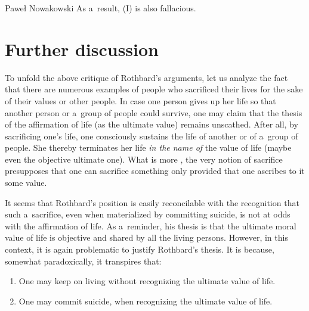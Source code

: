 \begin{artengenv}{Paweł Nowakowski}
As a~result, (I) is also fallacious.



\section{Further discussion}

To unfold the above critique of Rothbard's arguments, let us analyze the fact that there are numerous examples of people who sacrificed their lives for the sake of their values or other people. In case one person gives up her life so that another person or a~group of people could survive, one may claim that the thesis of the affirmation of life (as the ultimate value) remains unscathed. After all, by sacrificing one's life, one consciously sustains the life of another or of a~group of people. She thereby terminates her life \textit{in the name of} the value of life (maybe even the objective ultimate one). What is more 
\parencites[see][p.1]{Raz2017On}[][p.76]{Weiss1949Sacrifice}, %
 the very notion of sacrifice presupposes that one can sacrifice something only provided that one ascribes to it some value.



It seems that Rothbard's position is easily reconcilable with the recognition that such a~sacrifice, even when materialized by committing suicide, is not at odds with the affirmation of life. As a~reminder, his thesis is that the ultimate moral value of life is objective and shared by all the living persons. However, in this context, it is again problematic to justify Rothbard's thesis. It is because, somewhat paradoxically, it transpires that:



\begin{enumerate}[label=(\arabic*)]

\item  One may keep on living without recognizing the ultimate value of life.



\item One may commit suicide, when recognizing the ultimate value of life.

\end{enumerate}


\end{artengenv}
